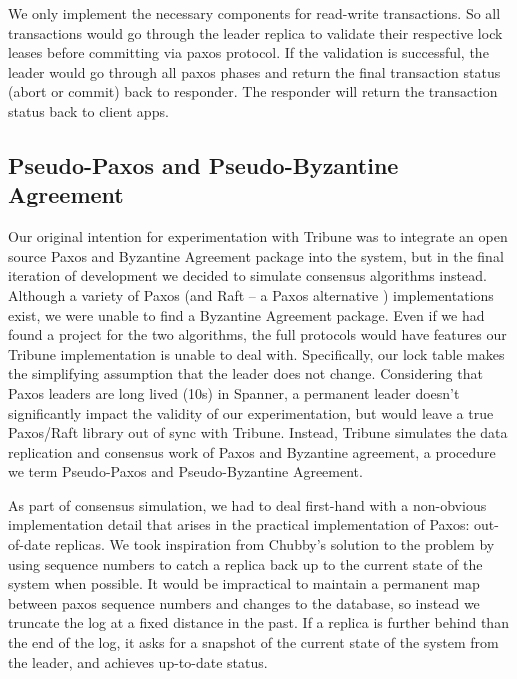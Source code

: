 \documentclass[10pt,twocolumn]{article}
\begin{document}
We only implement the necessary components for read-write transactions. So all transactions would go through the leader replica to validate their respective lock leases before committing via paxos protocol. If the validation is successful, the leader would go through all paxos phases and return the final transaction status (abort or commit) back to responder. The responder will return the transaction status back to client apps.



\subsection{Pseudo-Paxos and Pseudo-Byzantine Agreement}

Our original intention for experimentation with Tribune was to integrate an open source Paxos and Byzantine Agreement package into the system, but in the final iteration of development we decided to simulate consensus algorithms instead. Although a variety of Paxos (and Raft \cite{ongaro_search_2014} -- a Paxos alternative ) implementations exist, we were unable to find a  Byzantine Agreement package. Even if we had found a project for the two algorithms, the full protocols would have features our Tribune implementation is unable to deal with. Specifically, our lock table makes the simplifying assumption that the leader does not change. Considering that Paxos leaders are long lived (10s) in Spanner, a permanent leader doesn't significantly impact the validity of our experimentation, but would leave a true Paxos/Raft library out of sync with Tribune. Instead, Tribune simulates the data replication and consensus work of Paxos and Byzantine agreement, a procedure we term Pseudo-Paxos and Pseudo-Byzantine Agreement.

As part of consensus simulation, we had to deal first-hand with a non-obvious implementation detail that arises in the practical implementation of Paxos: out-of-date replicas. We took inspiration from Chubby's solution to the problem  \cite{chandra_paxos_2007} by using sequence numbers to catch a replica back up to the current state of the system when possible. It would be impractical to maintain a permanent map between paxos sequence numbers and changes to the database, so instead we truncate the log at a fixed distance in the past. If a replica is further behind than the end of the log, it asks for a snapshot of the current state of the system from the leader, and achieves up-to-date status.

\end{document}
